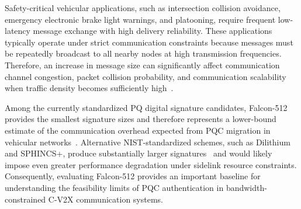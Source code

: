 \documentclass[conference]{IEEEtran}
\begin{document}
Safety-critical vehicular applications, such as intersection collision avoidance, emergency electronic brake light warnings, and platooning, require frequent low-latency message exchange with high delivery reliability. These applications typically operate under strict communication constraints because messages must be repeatedly broadcast to all nearby nodes at high transmission frequencies. Therefore, an increase in message size can significantly affect communication channel congestion, packet collision probability, and communication scalability when traffic density becomes sufficiently high~\cite{hajisami2022tutorial}.

Among the currently standardized PQ digital signature candidates, Falcon-512 provides the smallest signature sizes and therefore represents a lower-bound estimate of the communication overhead expected from PQC migration in vehicular networks~\cite{mamun_pqc}. Alternative NIST-standardized schemes, such as Dilithium and SPHINCS+, produce substantially larger signatures~\cite{mamun_pqc} and would likely impose even greater performance degradation under sidelink resource constraints. Consequently, evaluating Falcon-512 provides an important baseline for understanding the feasibility limits of PQC authentication in bandwidth-constrained C-V2X communication systems.
\end{document}
